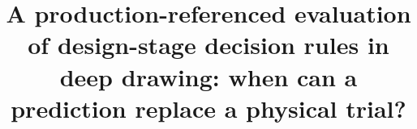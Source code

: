 \documentclass[pdflatex,sn-basic,lineno]{sn-jnl}
\newif\ifanon
\providecommand{\DIFdelbegin}{} %
\newcommand{\DIFscaledelfig}{0.5}
\newlength{\DIFdelgraphicswidth} %
\newlength{\DIFdelgraphicsheight} %
\newcommand{\DIFdelincludegraphics}[2][]{%
\sbox{\DIFdelgraphicsbox}{\DIFOincludegraphics[#1]{#2}}%
\settoboxwidth{\DIFdelgraphicswidth}{\DIFdelgraphicsbox} %
\settoboxtotalheight{\DIFdelgraphicsheight}{\DIFdelgraphicsbox} %
\scalebox{\DIFscaledelfig}{%
\parbox[b]{\DIFdelgraphicswidth}{\usebox{\DIFdelgraphicsbox}\\[-\baselineskip] \rule{\DIFdelgraphicswidth}{0em}}\llap{\resizebox{\DIFdelgraphicswidth}{\DIFdelgraphicsheight}{%
\setlength{\unitlength}{\DIFdelgraphicswidth}%
\begin{picture}(1,1)%
\thicklines\linethickness{2pt} %
{\color[rgb]{1,0,0}\put(0,0){\framebox(1,1){}}}%
{\color[rgb]{1,0,0}\put(0,0){\line( 1,1){1}}}%
{\color[rgb]{1,0,0}\put(0,1){\line(1,-1){1}}}%
\end{picture}%
}\hspace*{3pt}}} %
} %
\DeclareRobustCommand{\DIFdelbegin}{\DIFOdelbegin \let\includegraphics\DIFdelincludegraphics} %
\begin{document}
\title[Evaluation of design-stage decision rules in deep drawing]{A production-referenced evaluation of design-stage decision rules in deep drawing: when can a prediction replace a physical trial?}

\ifanon
\author*[1]{\fnm{Anonymized} \sur{for review}}
\affil*[1]{\orgname{Affiliation withheld for review}}
\else
\author*[1]{ }

\fi

\DIFdelbegin %
\end{document}
